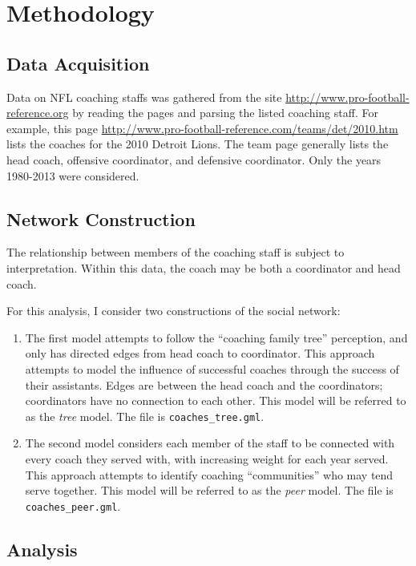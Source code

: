 \documentclass{article}\usepackage[]{graphicx}\usepackage[]{color}
\begin{document}
\section{Methodology}

\subsection{Data Acquisition}

Data on NFL coaching staffs was gathered from the site
\url{http://www.pro-football-reference.org} by reading the pages and parsing
the listed coaching staff.  For example, this page
\url{http://www.pro-football-reference.com/teams/det/2010.htm} lists the
coaches for the 2010 Detroit Lions.  The team page generally lists the head
coach, offensive coordinator, and defensive coordinator.  Only the years
1980-2013 were considered.

\subsection{Network Construction}

The relationship between members of the coaching staff is subject to
interpretation.  Within this data, the coach may be both a coordinator and head
coach.  

For this analysis, I consider two constructions of the social network:
\begin{enumerate}

\item The first model attempts to follow the ``coaching family tree''
perception, and only has directed edges from head coach to coordinator.  This
approach attempts to model the influence of successful coaches through the
success of their assistants.  Edges are between the head coach and the
coordinators; coordinators have no connection to each other.  This model will
be referred to as the \emph{tree} model.  The file is {\tt coaches\_tree.gml}.

\item The second model considers each member of the staff to be connected with
every coach they served with, with increasing weight for each year served.
This approach attempts to identify coaching ``communities'' who may tend serve
together.  This model will be referred to as the \emph{peer} model.  The file
is {\tt coaches\_peer.gml}.

\end{enumerate}

\subsection{Analysis}
\end{document}
